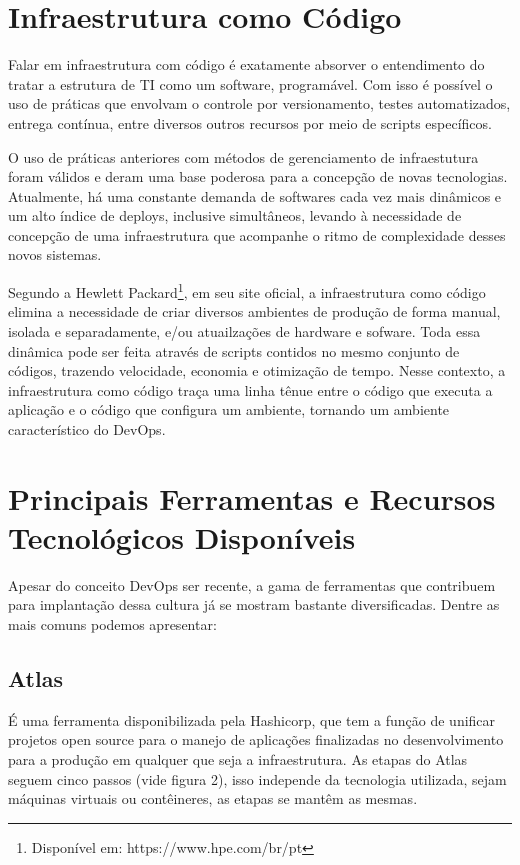 \section{Infraestrutura como Código}
Falar em infraestrutura com código é exatamente absorver o entendimento do tratar a estrutura de TI como um software, programável. Com isso é possível o uso de práticas que envolvam o controle por versionamento, testes automatizados, entrega contínua, entre diversos outros recursos por meio de scripts específicos.

O uso de práticas anteriores com métodos de gerenciamento de infraestutura foram válidos e deram uma base poderosa para a concepção de novas tecnologias. Atualmente, há  uma constante demanda de softwares cada vez mais dinâmicos e um alto índice de deploys, inclusive simultâneos, levando à necessidade de concepção de uma infraestrutura que acompanhe o ritmo de complexidade desses novos sistemas.

Segundo a Hewlett Packard\footnote{Disponível em: https://www.hpe.com/br/pt}, em seu site oficial, a infraestrutura como código elimina a necessidade de criar diversos ambientes de produção de forma manual, isolada e separadamente, e/ou atuailzações de hardware e sofware. Toda essa dinâmica pode ser feita através de scripts contidos no mesmo conjunto de códigos, trazendo velocidade, economia e otimização de tempo. Nesse contexto, a infraestrutura como código traça uma linha tênue entre o código que executa a aplicação e o código que configura um ambiente, tornando um ambiente característico do DevOps.


\section{Principais Ferramentas e Recursos Tecnológicos Disponíveis}
Apesar do conceito DevOps ser recente, a gama de ferramentas que contribuem para implantação dessa cultura já se mostram bastante diversificadas. Dentre as mais comuns podemos apresentar:

\subsection{Atlas}
É uma ferramenta disponibilizada pela Hashicorp, que tem a função de unificar projetos open source para o manejo de aplicações finalizadas no desenvolvimento para a produção em qualquer que seja a infraestrutura.
As etapas do Atlas seguem cinco passos (vide figura 2), isso independe da tecnologia utilizada, sejam máquinas virtuais ou contêineres, as etapas se mantêm as mesmas. \cite{hashimoto}

